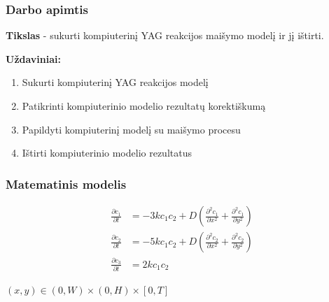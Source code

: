 \documentclass{beamer}
\begin{document}
\begin{frame}
\frametitle{Darbo apimtis}
\textbf{Tikslas} - sukurti kompiuterinį YAG reakcijos maišymo modelį ir jį ištirti.

\textbf{Uždaviniai:}
\begin{enumerate}
\item Sukurti kompiuterinį YAG reakcijos modelį
\item Patikrinti kompiuterinio modelio rezultatų korektiškumą
\item Papildyti kompiuterinį modelį su maišymo procesu
\item Ištirti kompiuterinio modelio rezultatus
\end{enumerate}

\end{frame}

\begin{frame}
\frametitle{Matematinis modelis}

\begin{align*}
    \frac{\partial c_1}{\partial t} & =-3kc_1c_2+D\left(\frac{\partial^2c_1}{\partial x^2}+\frac{\partial^2c_1}{\partial y^2}\right) \\
    \frac{\partial c_2}{\partial t} & =-5kc_1c_2+D\left(\frac{\partial^2c_2}{\partial x^2}+\frac{\partial^2c_2}{\partial y^2}\right)\\
    \frac{\partial c_3}{\partial t} & =2kc_1c_2
\end{align*}

$(x, y)\in(0, W)\times(0, H)\times[0, T]$

\end{frame}
\end{document}
